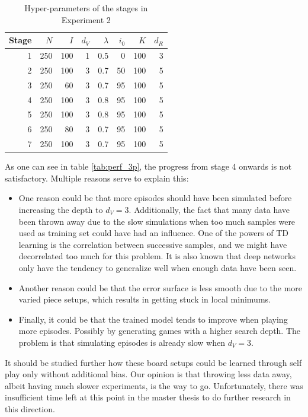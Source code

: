 \begin{table}[]
\centering
\caption{Hyper-parameters of the stages in Experiment 2}
\label{tab:exp3}
\begin{tabular}{r|rrrrrrr}
\textbf{Stage} & \textbf{$N$}  & \textbf{$I$} & \textbf{$d_V$} & \textbf{$\lambda$}& \textbf{$i_0$} & $K$ & $d_R$ \\ \hline
1     & 250 & 100  & 1     & 0.5  & 0 & 100 & 3   \\
2     & 250 & 100  & 3     & 0.7  & 50 & 100  & 5  \\
3     & 250 & 60  & 3     & 0.7  & 95 & 100  & 5  \\
4     & 250  & 100  & 3     & 0.8  & 95 & 100 & 5   \\
5     & 250  & 100  & 3     & 0.8  & 95 & 100 & 5    \\ 
6     & 250  & 80  & 3     & 0.7  & 95 & 100 & 5    \\ 
7     & 250  & 100  & 3     & 0.7  & 95 & 100 & 5    \\  
\end{tabular}
\end{table}

As one can see in table \ref{tab:perf_3p}, the progress from stage 4 onwards is not satisfactory. Multiple reasons serve to explain this:
\begin{itemize}
\item One reason could be that more episodes should have been simulated before increasing the depth to $d_V=3$. Additionally, the fact that many data have been thrown away due to the slow simulations when too much samples were used as training set could have had an influence. One of the powers of TD learning is the correlation between successive samples, and we might have decorrelated too much for this problem. It is also known that deep networks only have the tendency to generalize well when enough data have been seen.
\item Another reason could be that the error surface is less smooth due to the more varied piece setups, which results in getting stuck in local minimums.
\item Finally, it could be that the trained model tends to improve when playing more episodes. Possibly by generating games with a higher search depth. The problem is that simulating episodes is already slow when $d_V=3$.
\end{itemize}

It should be studied further how these board setups could be learned through self play only without additional bias. Our opinion is that throwing less data away, albeit having much slower experiments, is the way to go. Unfortunately, there was insufficient time left at this point in the master thesis to do further research in this direction.

